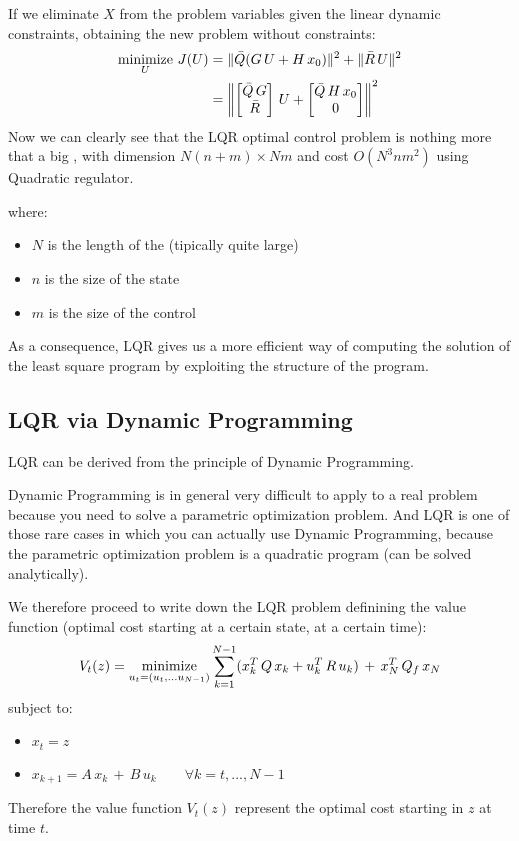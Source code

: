 If we eliminate $X$ from the problem variables given the linear dynamic constraints, obtaining the new problem without constraints:
\begin{align*}
\operatorname*{minimize}_{U}\,J(U) &= \lVert\bar{Q} (G\,U + H\,x_0)\rVert^2 + \lVert\bar{R}\,U\rVert^2\\
&= \left\lVert\begin{bmatrix}\bar{Q}\,G\\\bar{R}\end{bmatrix} \,U + \begin{bmatrix}\bar{Q}\,H\,x_0\\0\end{bmatrix}\right\rVert^2
\end{align*}
Now we can clearly see that the LQR optimal control problem is nothing more that a big , with dimension $N(n+m)\times Nm$ and cost $O(N^3nm^2)$ using Quadratic regulator.

where:
\begin{itemize}
\item $N$ is the length of the  (tipically quite large)
\item $n$ is the size of the state
\item $m$ is the size of the control
\end{itemize}

As a consequence, LQR gives us a more efficient way of computing the solution of the least square program by exploiting the structure of the program.

\subsection{LQR via Dynamic Programming}
LQR can be derived from the principle of Dynamic Programming.

Dynamic Programming is in general very difficult to apply to a real problem because you need to solve a parametric optimization problem. And LQR is one of those rare cases in which you can actually use Dynamic Programming, because the parametric optimization problem is a quadratic program (can be solved analytically).

We therefore proceed to write down the LQR problem definining the value function (optimal cost starting at a certain state, at a certain time):
\[V_t(z) = \operatorname*{minimize}_{u_t = (u_t,...u_{N-1})} \sum_{k=1}^{N-1}(x_k^T\,Q\,x_k + u_k^T\,R\,u_k)\,+\,x_N^T\,Q_f\,x_N\]
subject to:
\begin{itemize}
\item $x_t = z$
\item $x_{k+1} = A\,x_k\,+\,B\,u_k\qquad\forall k = t, ..., N-1$
\end{itemize}
Therefore the value function $V_t(z)$ represent the optimal cost starting in $z$ at time $t$.

